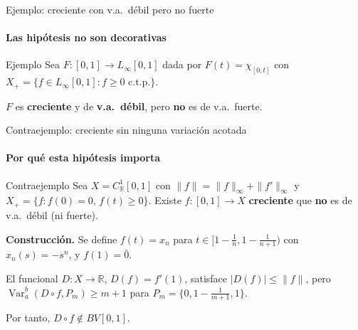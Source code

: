 \documentclass{beamer}
\newcommand{\Xp}{X_{+}}               %
\newcommand{\Var}{\operatorname{Var}}  %
\begin{document}

\begin{frame}{Ejemplo: creciente con v.a.\ débil pero no fuerte}
\framesubtitle{Las hipótesis no son decorativas}

\begin{block}{Ejemplo}
Sea $F:[0,1]\to L_\infty[0,1]$ dada por $F(t)=\chi_{[0,t]}$
con $\Xp=\{f\in L_\infty[0,1]:f\ge 0 \text{ c.t.p.}\}$.

\medskip
$F$ es \textbf{creciente} y de \textbf{v.a.\ débil}, pero
\textbf{no} es de v.a.\ fuerte.
\end{block}


\end{frame}


\begin{frame}{Contraejemplo: creciente sin ninguna variación acotada}
\framesubtitle{Por qué esta hipótesis importa}

\begin{block}{Contraejemplo}
Sea $X=C_{\mathbb{R}}^1[0,1]$ con $\|f\|=\|f\|_\infty+\|f'\|_\infty$
y $\Xp=\{f:f(0)=0,\,f(t)\ge 0\}$.
Existe $f:[0,1]\to X$ \textbf{creciente} que
\textbf{no} es de v.a.\ débil (ni fuerte).
\end{block}

{\small
\textbf{Construcción.}
Se define
$f(t) = x_n$ para $t\in[1-\tfrac{1}{n},1-\tfrac{1}{n+1})$
con $x_n(s)=-s^n$, y $f(1)=\bar{0}$.

El funcional $D:X\to\mathbb{R}$, $D(f)=f'(1)$, satisface
$|D(f)|\le\|f\|$, pero
$\Var_a^b(D\circ f,P_m)\ge m+1$ para $P_m=\{0,1-\tfrac{1}{m+1},1\}$.

Por tanto, $D\circ f\notin BV[0,1]$.
}

\end{frame}
\end{document}
